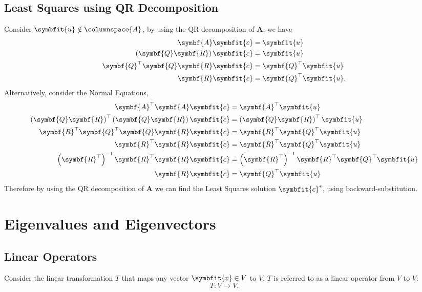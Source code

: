 \documentclass{article}
\begin{document}
\subsection{Least Squares using QR Decomposition}
Consider \(\symbfit{u} \notin \columnspace{A}\), by using the QR decomposition of \(\symbf{A}\), we have
\begin{align*}
    \symbf{A} \symbfit{c}                          & = \symbfit{u}                 \\
    \left( \symbf{Q} \symbf{R} \right) \symbfit{c} & = \symbfit{u}                 \\
    \symbf{Q}^\top \symbf{Q} \symbf{R} \symbfit{c} & = \symbf{Q}^\top \symbfit{u}  \\
    \symbf{R} \symbfit{c}                          & = \symbf{Q}^\top \symbfit{u}.
\end{align*}
Alternatively, consider the Normal Equations,
\begin{align*}
    \symbf{A}^\top \symbf{A} \symbfit{c}                                                   & = \symbf{A}^\top \symbfit{u}                                                   \\
    \left( \symbf{Q} \symbf{R} \right)^\top \left( \symbf{Q} \symbf{R} \right) \symbfit{c} & = \left( \symbf{Q} \symbf{R} \right)^\top \symbfit{u}                          \\
    \symbf{R}^\top \symbf{Q}^\top \symbf{Q} \symbf{R} \symbfit{c}                          & = \symbf{R}^\top \symbf{Q}^\top \symbfit{u}                                    \\
    \symbf{R}^\top \symbf{R} \symbfit{c}                                                   & = \symbf{R}^\top \symbf{Q}^\top \symbfit{u}                                    \\
    \left( \symbf{R}^\top \right)^{-1} \symbf{R}^\top \symbf{R} \symbfit{c}                & = \left( \symbf{R}^\top \right)^{-1} \symbf{R}^\top \symbf{Q}^\top \symbfit{u} \\
    \symbf{R} \symbfit{c}                                                                  & = \symbf{Q}^\top \symbfit{u}
\end{align*}
Therefore by using the QR decomposition of \(\symbf{A}\) we can find the Least Squares solution \(\symbfit{c}^\ast\), using backward-substitution.
\section{Eigenvalues and Eigenvectors}
\subsection{Linear Operators}
Consider the linear transformation \(T\) that maps any vector
\(\symbfit{v}\in V\) to \(V\). \(T\) is referred to as a linear operator from \(V\) to \(V\):
\begin{equation*}
    T:V \to V.
\end{equation*}
\end{document}
